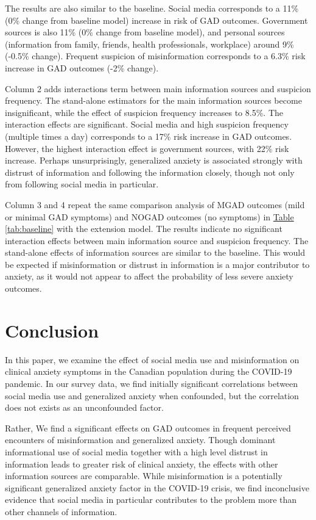 \documentclass{article}[12pt]
\begin{document}
        The results are also similar to the baseline. Social media corresponds to a 11\% (0\% change from baseline model) increase in risk of GAD outcomes. Government sources is also 11\% (0\% change from baseline model), and personal sources (information from family, friends, health professionals, workplace) around 9\% (-0.5\% change). Frequent suspicion of misinformation corresponds to a 6.3\% risk increase in GAD outcomes (-2\% change).
        
        Column 2 adds interactions term between main information sources and suspicion frequency. The stand-alone estimators for the main information sources become insignificant, while the effect of suspicion frequency increases to 8.5\%. The interaction effects are significant. Social media and high suspicion frequency (multiple times a day) corresponds to a 17\% risk increase in GAD outcomes. However, the highest interaction effect is government sources, with 22\% risk increase. Perhaps unsurprisingly, generalized anxiety is associated strongly with distrust of information and following the information closely, though not only from following social media in particular.
        
        Column 3 and 4 repeat the same comparison analysis of MGAD outcomes (mild or minimal GAD symptoms) and NOGAD outcomes (no symptoms) in \hyperref[tab:baseline]{Table \ref{tab:baseline}} with the extension model. The results indicate no significant interaction effects between main information source and suspicion frequency. The stand-alone effects of information sources are similar to the baseline. This would be expected if misinformation or distrust in information is a major contributor to anxiety, as it would not appear to affect the probability of less severe anxiety outcomes.
        
        
        
    \section{Conclusion}
    
        In this paper, we examine the effect of social media use and misinformation on clinical anxiety symptoms in the Canadian population during the COVID-19 pandemic. In our survey data, we find initially significant correlations between social media use and generalized anxiety when confounded, but the correlation does not exists as an unconfounded factor.
        
        Rather, We find a significant effects on GAD outcomes in frequent perceived encounters of misinformation and generalized anxiety. Though dominant informational use of social media together with a high level distrust in information leads to greater risk of clinical anxiety, the effects with other information sources are comparable. While misinformation is a potentially significant generalized anxiety factor in the COVID-19 crisis, we find inconclusive evidence that social media in particular contributes to the problem more than other channels of information.
    
\end{document}
